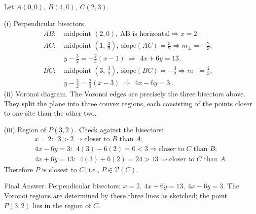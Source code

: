 \documentclass[11pt]{article}
\def\textbf#1{#1}%
\begin{document}
\begin{solution}
Let \(A(0,0),\ B(4,0),\ C(2,3)\).

\textbf{(i) Perpendicular bisectors.}
\[
\begin{aligned}
\overline{AB}:&\ \text{midpoint }(2,0),\ \text{AB is horizontal} \Rightarrow \boxed{x=2}.\\[2mm]
\overline{AC}:&\ \text{midpoint }(1,\,\tfrac32),\ \text{slope}(AC)=\tfrac32
\Rightarrow m_\perp=-\tfrac23,\\
&\ y-\tfrac32=-\tfrac23(x-1)\ \Longrightarrow\ \boxed{\,4x+6y=13\,}.\\[2mm]
\overline{BC}:&\ \text{midpoint }(3,\,\tfrac32),\ \text{slope}(BC)=-\tfrac32
\Rightarrow m_\perp=\tfrac23,\\
&\ y-\tfrac32=\tfrac23(x-3)\ \Longrightarrow\ \boxed{\,4x-6y=3\,}.
\end{aligned}
\]
\textbf{(ii) Voronoi diagram.}
The Voronoi edges are precisely the three bisectors above.  
They split the plane into three convex regions, each consisting of the points closer to one site than the other two.

\begin{center}
\end{center}

\textbf{(iii) Region of \(P(3,2)\).}
Check against the bisectors:
\[
\begin{aligned}
&x=2:\ \ 3>2 \Rightarrow \text{closer to }B\text{ than }A;\\
&4x-6y=3:\ \ 4(3)-6(2)=0<3 \Rightarrow \text{closer to }C\text{ than }B;\\
&4x+6y=13:\ \ 4(3)+6(2)=24>13 \Rightarrow \text{closer to }C\text{ than }A.
\end{aligned}
\]
Therefore \(P\) is closest to \(C\); i.e., \(P\in\mathcal V(C)\).

\textbf{Final Answer:}  
Perpendicular bisectors: \(\boxed{x=2},\ \boxed{4x+6y=13},\ \boxed{4x-6y=3}\).  
The Voronoi regions are determined by these three lines as sketched; the point \(P(3,2)\) lies in the region of \(C\).
\end{solution}
\end{document}
